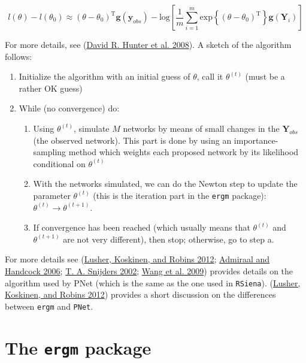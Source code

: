 \documentclass[
]{book}
\begin{document}
\[
l(\theta) - l(\theta_0) \approx (\theta - \theta_0)^{\mbox{T}}\mathbf{g}(\mathbf{y}_{obs}) - 
\mbox{log}{\left[\frac{1}{m}\sum_{i = 1}^m\mbox{exp}\left\{(\theta-\theta_0)^{\mbox{T}}\right\}\mathbf{g}(\mathbf{Y}_i)\right]}
\]

For more details, see (\protect\hyperlink{ref-Hunter2008}{David R. Hunter et al. 2008}). A sketch of the algorithm follows:

\begin{enumerate}
\def\labelenumi{\arabic{enumi}.}
\item
  Initialize the algorithm with an initial guess of \(\theta\), call it \(\theta^{(t)}\) (must be a rather OK guess)
\item
  While (no convergence) do:

  \begin{enumerate}
  \def\labelenumii{\alph{enumii}.}
  \item
    Using \(\theta^{(t)}\), simulate \(M\) networks by means of small changes in the \(\mathbf{Y}_{obs}\) (the observed network). This part is done by using an importance-sampling method which weights each proposed network by its likelihood conditional on \(\theta^{(t)}\)
  \item
    With the networks simulated, we can do the Newton step to update the parameter \(\theta^{(t)}\) (this is the iteration part in the \texttt{ergm} package): \(\theta^{(t)}\to\theta^{(t+1)}\).
  \item
    If convergence has been reached (which usually means that \(\theta^{(t)}\) and \(\theta^{(t + 1)}\) are not very different), then stop; otherwise, go to step a.
  \end{enumerate}
\end{enumerate}

For more details see (\protect\hyperlink{ref-lusher2012}{Lusher, Koskinen, and Robins 2012}; \protect\hyperlink{ref-admiraal2006}{Admiraal and Handcock 2006}; \protect\hyperlink{ref-Snijders2002}{T. A. Snijders 2002}; \protect\hyperlink{ref-Wang2009}{Wang et al. 2009}) provides details on the algorithm used by PNet (which is the same as the one used in \texttt{RSiena}). (\protect\hyperlink{ref-lusher2012}{Lusher, Koskinen, and Robins 2012}) provides a short discussion on the differences between \texttt{ergm} and \texttt{PNet}.

\hypertarget{the-ergm-package}{%
\section{\texorpdfstring{The \texttt{ergm} package}{The ergm package}}\label{the-ergm-package}}
\end{document}
